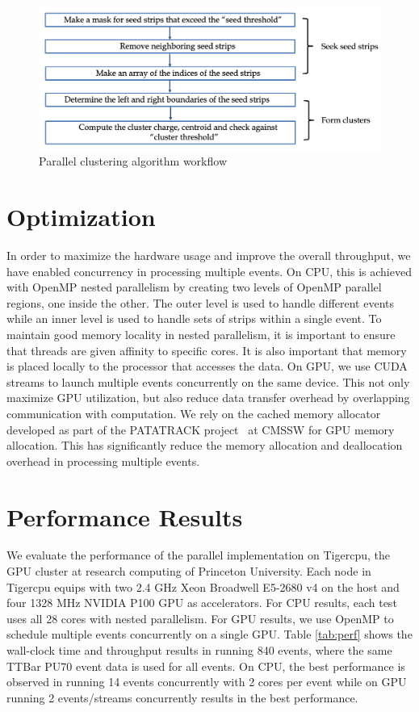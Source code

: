 \documentclass[10pt, paper=a4, UKenglish]{article}
\begin{document}
\begin{figure}[!htb]
  \centering
  \includegraphics[scale=0.4]{workflow}
  \caption{Parallel clustering algorithm workflow}
  \label{fig:workflow}
\end{figure}


\section{Optimization}
\label{opt}
In order to maximize the hardware usage and improve the overall throughput, we have enabled concurrency in processing multiple events. On CPU, this is achieved with OpenMP nested parallelism by creating two levels of OpenMP parallel regions, one inside the other. The outer level is used to handle different events while an inner level is used to handle sets of strips within a single event. To maintain good memory locality in nested parallelism, it is important to ensure that threads are given affinity to specific cores. It is also important that memory is placed locally to the processor that accesses the data. On GPU, we use CUDA streams to launch multiple events concurrently on the same device. This not only maximize GPU utilization, but also reduce data transfer overhead by overlapping communication with computation. We rely on the cached memory allocator developed as part of the PATATRACK project~\cite{PATATRACK} at CMSSW for GPU memory allocation. This has significantly reduce the memory allocation and deallocation overhead in processing multiple events. 

\section{Performance Results}
We evaluate the performance of the parallel implementation on Tigercpu, the GPU cluster at research computing of Princeton University. Each node in Tigercpu equips with two 2.4 GHz Xeon Broadwell E5-2680 v4 on the host and four 1328 MHz NVIDIA P100 GPU as accelerators. For CPU results, each test uses all 28 cores with nested parallelism. For GPU results, we use OpenMP to schedule multiple events concurrently on a single GPU. Table \ref{tab:perf} shows the wall-clock time and throughput results in running 840 events, where the same TTBar PU70 event data is used for all events. On CPU, the best performance is observed in running 14 events concurrently with 2 cores per event while on GPU running 2 events/streams concurrently results in the best performance. 
\end{document}

